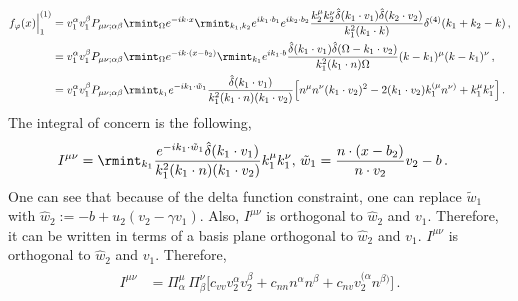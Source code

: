 \begin{align}
    \begin{split} \label{5.38nm}
        f_{\varphi}(x)\Big|_{1}^{(1)}&=v_1^{\alpha}v_1^{\beta}P_{\mu\nu;\alpha\beta}\rmint_{\Omega}e^{-ik\cdot x}\rmint_{k_1,k_2}e^{ik_1\cdot b_1}e^{ik_2\cdot b_2}\frac{k_2^\mu k_2^\nu\hat\delta(k_1\cdot v_1)\hat\delta(k_2\cdot v_2)}{k_1^2(k_1\cdot k)}\delta^{(4)}(k_1+k_2-k)\,,\\ &
=v_1^{\alpha}v_1^{\beta}P_{\mu\nu;\alpha\beta}\rmint_{\Omega}e^{-ik\cdot (x-b_2)}\rmint_{k_1}e^{ik_1\cdot b}\frac{\hat\delta(k_1\cdot v_1)\hat\delta(\Omega-k_1\cdot v_2)}{k_1^2(k_1\cdot n)\Omega}(k-k_1)^{\mu}(k-k_1)^{\nu}\,,\\ &
=v_1^{\alpha}v_1^{\beta}P_{\mu\nu;\alpha\beta}\rmint_{k_1}e^{-i k_1\cdot \tilde w_1}\frac{\hat\delta(k_1\cdot v_1)}{k_1^2 (k_1\cdot n)(k_1\cdot v_2)}\Big[n^\mu n^\nu (k_1\cdot v_2)^2-2 (k_1\cdot v_2)k_1^{(\mu}n^{\nu)}+k_1^{\mu}k_1^{\nu}\Big]\,.
    \end{split}
\end{align}
The integral of concern is the following,
\begin{align}
    \begin{split}
        I^{\mu\nu}&=\rmint_{k_1}\frac{e^{-ik_1\cdot \tilde w_1}\hat\delta(k_1\cdot v_1)}{k_1^2(k_1\cdot n)(k_1\cdot v_2)}k_1^{\mu}k_1^{\nu},\, \tilde w_1=\frac{n\cdot (x-b_2)}{n\cdot v_2}v_2-b\,.\label{5.29mmm}
    \end{split}
    \end{align}
{\color{black}One can see that because of the delta function constraint, one can replace  $\tilde w_1$ with $\hat w_2:=-b+u_2 (v_2-\gamma v_1)$. Also, $I^{\mu\nu}$ is orthogonal to $\hat w_2$ and $v_1$. Therefore, it can be written in terms of a basis plane orthogonal to  $\hat w_2$ and $v_1$.} $I^{\mu\nu}$ is orthogonal to $\hat w_2$ and $v_1$.  Therefore,
    \begin{align}
        \begin{split}
I^{\mu\nu}&=\Pi^{\mu}_{\alpha}\,\Pi^{\nu}_{\beta}\Big[c_{vv} v_2^{\alpha}v_2^{\beta}+c_{nn} n^{\alpha}n^{\beta}+c_{nv} v_2^{(\alpha}n^{\beta)}\Big]\,.
        \end{split}
    \end{align}
